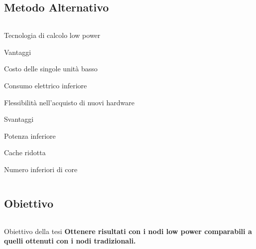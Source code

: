 \documentclass{beamer}
\begin{document}
\subsection{Metodo Alternativo}
\begin{frame}
\begin{columns}
\begin{column}{0.8\linewidth}		
\begin{block}{Tecnologia di calcolo low power}
\begin{itemize}
\begin{block}{Vantaggi}
\small
\item Costo delle singole unità basso
\item Consumo elettrico inferiore
\item Flessibilità nell'acquisto di nuovi hardware
\end{block}
\begin{block}{Svantaggi}
\small
\item Potenza inferiore
\item Cache ridotta
\item Numero inferiori di core
\end{block}
\end{itemize}
\end{block}
\end{column}
\end{columns}
\end{frame}

\subsection{Obiettivo}
\begin{frame}
\begin{columns}
\begin{column}{0.8\linewidth}		
\begin{block}{Obiettivo della tesi}
\small
\textbf{Ottenere risultati con i nodi low power
comparabili a quelli ottenuti con i nodi tradizionali.}
\end{block}
\end{column}
\end{columns}
\end{frame}
\end{document}
